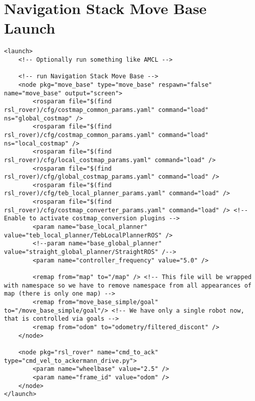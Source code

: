 \section{Navigation Stack Move Base Launch}
\begin{verbatim}
<launch>
	<!-- Optionally run something like AMCL -->

	<!-- run Navigation Stack Move Base -->
  	<node pkg="move_base" type="move_base" respawn="false" name="move_base" output="screen">
	    <rosparam file="$(find rsl_rover)/cfg/costmap_common_params.yaml" command="load" ns="global_costmap" />
	    <rosparam file="$(find rsl_rover)/cfg/costmap_common_params.yaml" command="load" ns="local_costmap" />
	    <rosparam file="$(find rsl_rover)/cfg/local_costmap_params.yaml" command="load" />
	    <rosparam file="$(find rsl_rover)/cfg/global_costmap_params.yaml" command="load" />
	    <rosparam file="$(find rsl_rover)/cfg/teb_local_planner_params.yaml" command="load" />
	    <rosparam file="$(find rsl_rover)/cfg/costmap_converter_params.yaml" command="load" /> <!-- Enable to activate costmap_conversion plugins -->
	    <param name="base_local_planner" value="teb_local_planner/TebLocalPlannerROS" />
	    <!--param name="base_global_planner" value="straight_global_planner/StraightROS" /-->
	    <param name="controller_frequency" value="5.0" />

	    <remap from="map" to="/map" /> <!-- This file will be wrapped with namespace so we have to remove namespace from all appearances of map (there is only one map) -->
	    <remap from="move_base_simple/goal" to="/move_base_simple/goal"/> <!-- We have only a single robot now, that is controlled via goals -->
	    <remap from="odom" to="odometry/filtered_discont" />
 	</node>

	<node pkg="rsl_rover" name="cmd_to_ack" type="cmd_vel_to_ackermann_drive.py">
		<param name="wheelbase" value="2.5" />
		<param name="frame_id" value="odom" />
	</node>
</launch>

\end{verbatim}




